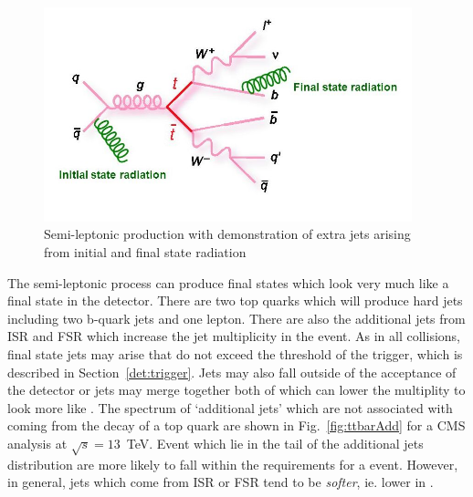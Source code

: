 \begin{figure}[ht!]
\begin{center}
    \includegraphics[width=0.95\textwidth]{images/Theory/ttbarISRFSR.jpg}
    \caption{Semi-leptonic \ttbar production with demonstration of extra jets arising from initial and final state radiation}
    \label{fig:ttbarback}
\end{center}
\end{figure}

The semi-leptonic \ttbar process can produce final states which look very much like a \tttt final state in the detector. There are two top quarks which will produce hard jets including two b-quark jets and one lepton. There are also the additional jets from ISR and FSR which increase the jet multiplicity in the event. As in all collisions, final state jets may arise that do not exceed the \pt threshold of the trigger, which is described in Section~\ref{det:trigger}. Jets may also fall outside of the acceptance of the detector or jets may merge together both of which can lower the \tttt multiplity to look more like \ttbar. 
The spectrum of `additional jets' which are not associated with coming from the decay of a top quark are shown in Fig.~\ref{fig:ttbarAdd} for a CMS analysis at $\sqrt{s}=13$~TeV. Event which lie in the tail of the additional jets distribution are more likely to fall within the requirements for a \tttt event. However, in general, jets which come from ISR or FSR tend to be \emph{softer}, ie. lower in \pt.

